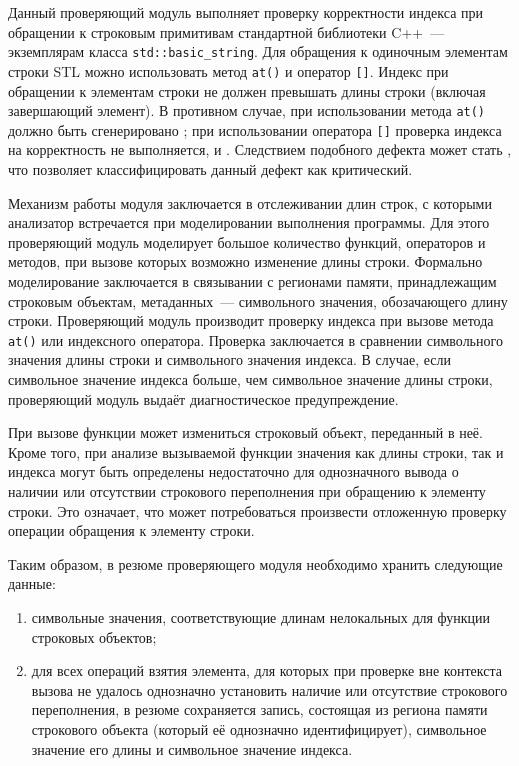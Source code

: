 Данный проверяющий модуль выполняет проверку корректности индекса при обращении к строковым примитивам стандартной библиотеки C++~--- экземплярам класса \texttt{std::basic\_string}. Для обращения к одиночным элементам строки STL можно использовать метод \texttt{at()} и оператор \texttt{[]}. Индекс при обращении к элементам строки не должен превышать длины строки (включая завершающий элемент). В противном случае, при использовании метода \texttt{at()} должно быть сгенерировано ; при использовании оператора \texttt{[]} проверка индекса на корректность не выполняется, и . Следствием подобного дефекта может стать , что позволяет классифицировать данный дефект как критический.

Механизм работы модуля заключается в отслеживании длин строк, с которыми анализатор встречается при моделировании выполнения программы. Для этого проверяющий модуль моделирует большое количество функций, операторов и методов, при вызове которых возможно изменение длины строки. Формально моделирование заключается в связывании с регионами памяти, принадлежащим строковым объектам, метаданных~--- символьного значения, обозачающего длину строки. Проверяющий модуль производит проверку индекса при вызове метода \texttt{at()} или индексного оператора. Проверка заключается в сравнении символьного значения длины строки и символьного значения индекса. В случае, если символьное значение индекса больше, чем символьное значение длины строки, проверяющий модуль выдаёт диагностическое предупреждение.

При вызове функции может измениться строковый объект, переданный в неё. Кроме того, при анализе вызываемой функции значения как длины строки, так и индекса могут быть определены недостаточно для однозначного вывода о наличии или отсутствии строкового переполнения при обращению к элементу строки. Это означает, что может потребоваться произвести отложенную проверку операции обращения к элементу строки.

Таким образом, в резюме проверяющего модуля необходимо хранить следующие данные:

\begin{enumerate}
 \item символьные значения, соответствующие длинам нелокальных для функции строковых объектов;
 \item для всех операций взятия элемента, для которых при проверке вне контекста вызова не удалось однозначно установить наличие или отсутствие строкового переполнения, в резюме сохраняется запись, состоящая из региона памяти строкового объекта (который её однозначно идентифицирует), символьное значение его длины и символьное значение индекса.
\end{enumerate}

